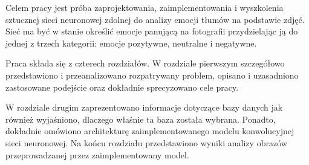 
Celem pracy jest próba zaprojektowania, zaimplementowania i wyszkolenia sztucznej sieci neuronowej zdolnej do analizy emocji tłumów na podstawie zdjęć. Sieć ma być w stanie określić emocje panującą na fotografii przydzielając ją do jednej z trzech kategorii: emocje pozytywne, neutralne i negatywne.



Praca składa się z czterech rozdziałów.
W rozdziale pierwszym szczegółowo przedstawiono i przeanalizowano rozpatrywany problem, opisano i uzasadniono zastosowane podejście oraz dokładnie sprecyzowano cele pracy.


W rozdziale drugim zaprezentowano informacje dotyczące bazy danych jak również wyjaśniono, dlaczego właśnie ta baza została wybrana. Ponadto, dokładnie omówiono architekturę zaimplementowanego modelu konwolucyjnej sieci neuronowej. Na końcu rozdziału przedstawiono wyniki analizy obrazów przeprowadzanej przez zaimplementowany model.


